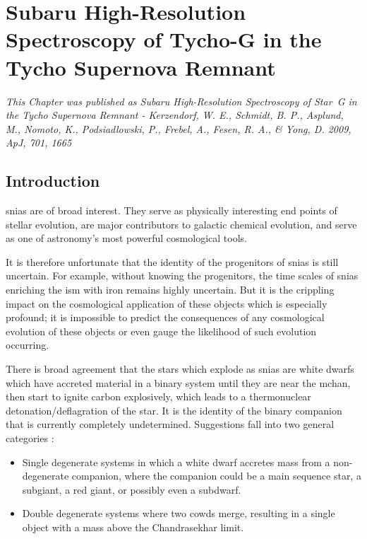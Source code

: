 \chapter[Subaru High-Resolution Spectroscopy of Tycho-G]{Subaru High-Resolution Spectroscopy of Tycho-G in the Tycho Supernova Remnant}
\label{chap:sn1572_starg}

\emph{\small This Chapter was published as Subaru High-Resolution Spectroscopy of Star~G in the Tycho Supernova Remnant - Kerzendorf, W. E., Schmidt, B. P., Asplund, M., Nomoto, K., Podsiadlowski, P., Frebel, A., Fesen, R. A., \& Yong, D. 2009, ApJ, 701, 1665}

\section{Introduction}
\glspl{snia} are of broad interest. They serve as
physically interesting end points of stellar evolution, are major
contributors to galactic chemical evolution, and serve as one of
astronomy's most powerful cosmological tools.

It is therefore unfortunate that the identity of the progenitors
of \glspl{snia} is still uncertain. For example, without knowing the progenitors,
the time scales of \glspl{snia} enriching the \gls{ism} with iron
remains highly uncertain. But it is the crippling impact on the
cosmological application of these objects which is especially
profound; it is impossible to predict the consequences of any
cosmological evolution of these objects or even gauge the likelihood of
such evolution occurring.

There is broad agreement that the stars which explode as \glspl{snia} are
white dwarfs which have accreted material in a binary system until
they are near the \gls{mchan}, then start to ignite carbon
explosively, which leads to a thermonuclear detonation/deflagration of the
star. It is the identity of the binary companion that is currently
completely undetermined. Suggestions fall into two general categories
\citep{1997thsu.conf..111I}:
\begin{itemize}
\item Single degenerate systems in which a white dwarf accretes mass
from a non-degenerate companion, where the companion could be a
main sequence star, a subgiant, a red giant, or possibly even a
subdwarf.
\item Double degenerate systems where two \glspl{cowd} merge,
resulting in a single object with a mass above the Chandrasekhar limit.
\end{itemize}

